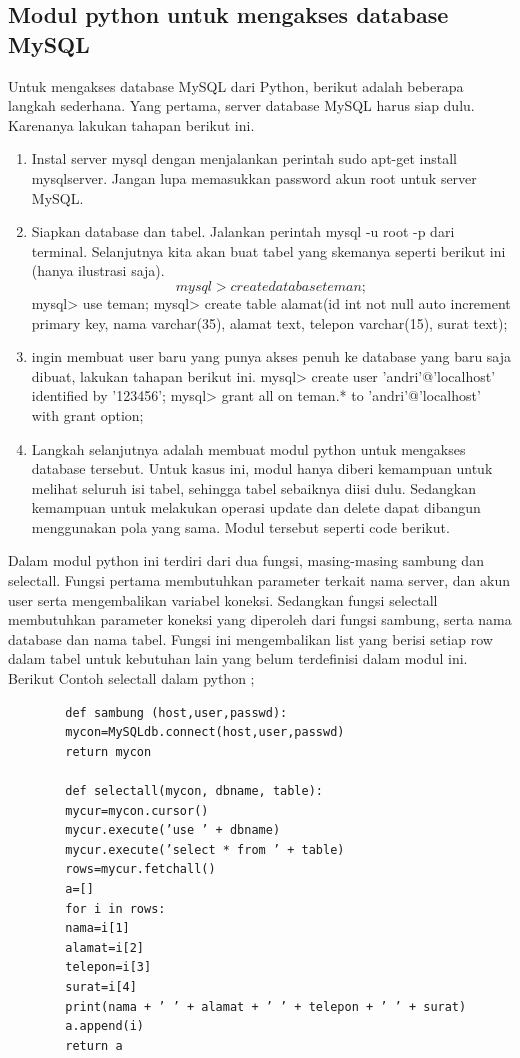 \subsection {Modul python untuk mengakses database MySQL}
	Untuk mengakses database MySQL dari Python, berikut adalah beberapa langkah sederhana. Yang pertama, server database MySQL harus siap dulu. Karenanya lakukan tahapan berikut ini. 
	\begin{enumerate}
		\item Instal server mysql dengan menjalankan perintah sudo apt-get install mysqlserver. Jangan lupa memasukkan password akun root untuk server MySQL. 
		\item Siapkan database dan tabel. Jalankan perintah mysql -u root -p dari terminal. 
			Selanjutnya kita akan buat tabel yang skemanya seperti berikut ini (hanya ilustrasi saja).
			\begin{equation} 
			mysql> create database teman; 
			\end{equation}
			mysql> use teman; 
			mysql> create table alamat(id int not null auto increment primary key, 
			nama varchar(35), alamat text, telepon varchar(15), surat text);

		\item  ingin membuat user baru yang punya akses penuh ke database yang baru saja dibuat, lakukan tahapan berikut ini. 
			mysql> create user 'andri'@'localhost' identified by '123456'; 	
			mysql> grant all on teman.* to 'andri'@'localhost' with grant option; 

		\item Langkah selanjutnya adalah membuat modul python untuk mengakses database tersebut. Untuk kasus ini, modul hanya diberi kemampuan untuk melihat seluruh isi tabel, sehingga tabel sebaiknya diisi dulu. Sedangkan kemampuan untuk melakukan operasi update dan delete dapat dibangun menggunakan pola yang sama. Modul tersebut seperti code berikut. 
	\end{enumerate}

Dalam modul python ini terdiri dari dua fungsi, masing-masing sambung dan selectall. Fungsi pertama membutuhkan parameter terkait nama server, dan akun user serta mengembalikan variabel koneksi. Sedangkan fungsi selectall membutuhkan parameter koneksi yang diperoleh dari fungsi sambung, serta nama database dan nama tabel. Fungsi ini mengembalikan list yang berisi setiap row dalam tabel untuk kebutuhan lain yang belum terdefinisi dalam modul ini. Berikut Contoh selectall dalam python ;

	\begin{verbatim}
		def sambung (host,user,passwd): 
		mycon=MySQLdb.connect(host,user,passwd) 
		return mycon
		
		def selectall(mycon, dbname, table): 
		mycur=mycon.cursor() 
		mycur.execute(’use ’ + dbname) 
		mycur.execute(’select * from ’ + table) 
		rows=mycur.fetchall() 
		a=[] 
		for i in rows: 
		nama=i[1] 
		alamat=i[2] 
		telepon=i[3] 
		surat=i[4] 
		print(nama + ’ ’ + alamat + ’ ’ + telepon + ’ ’ + surat) 
		a.append(i) 
		return a 
	\end{verbatim}

